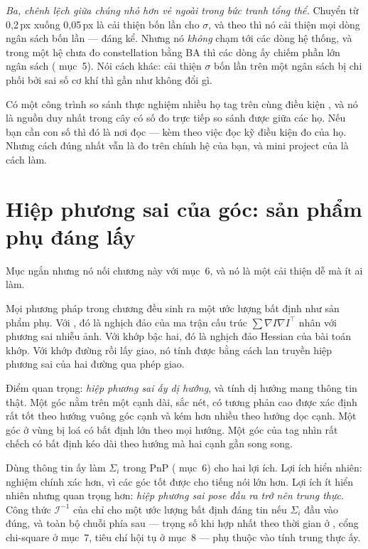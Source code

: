 \documentclass[../../marker.tex]{subfiles}
\begin{document}
\emph{Ba, chênh lệch giữa chúng nhỏ hơn vẻ ngoài trong bức tranh tổng thể.} Chuyển từ 0,2\,px xuống 0,05\,px là cải thiện bốn lần cho \(\sigma\), và theo  thì nó cải thiện mọi dòng ngân sách bốn lần --- đáng kể. Nhưng nó \emph{không} chạm tới các dòng hệ thống, và trong một hệ chưa đo constellation bằng BA thì các dòng ấy chiếm phần lớn ngân sách ( mục~5). Nói cách khác: cải thiện \(\sigma\) bốn lần trên một ngân sách bị chi phối bởi sai số cơ khí thì gần như không đổi gì.

Có một công trình so sánh thực nghiệm nhiều họ tag trên cùng điều kiện \cite{kalaitzakis2021fiducial}, và nó là nguồn duy nhất trong cây có số đo trực tiếp so sánh được giữa các họ. Nếu bạn cần con số thì đó là nơi đọc --- kèm theo việc đọc kỹ điều kiện đo của họ. Nhưng cách đúng nhất vẫn là đo trên chính hệ của bạn, và mini project của  là cách làm.

\section{Hiệp phương sai của góc: sản phẩm phụ đáng lấy}

Mục ngắn nhưng nó nối chương này với  mục~6, và nó là một cải thiện dễ mà ít ai làm.

Mọi phương pháp trong chương đều sinh ra một ước lượng bất định như sản phẩm phụ. Với , đó là nghịch đảo của ma trận cấu trúc \(\sum \nabla I \nabla I^\top\) nhân với phương sai nhiễu ảnh. Với khớp bậc hai, đó là nghịch đảo Hessian của bài toán khớp. Với khớp đường rồi lấy giao, nó tính được bằng cách lan truyền hiệp phương sai của hai đường qua phép giao.

Điểm quan trọng: \emph{hiệp phương sai ấy dị hướng}, và tính dị hướng mang thông tin thật. Một góc nằm trên một cạnh dài, sắc nét, có tương phản cao được xác định rất tốt theo hướng vuông góc cạnh và kém hơn nhiều theo hướng dọc cạnh. Một góc ở vùng bị loá có bất định lớn theo mọi hướng. Một góc của tag nhìn rất chếch có bất định kéo dài theo hướng mà hai cạnh gần song song.

Dùng thông tin ấy làm \(\Sigma_i\) trong PnP ( mục~6) cho hai lợi ích. Lợi ích hiển nhiên: nghiệm chính xác hơn, vì các góc tốt được cho tiếng nói lớn hơn. Lợi ích ít hiển nhiên nhưng quan trọng hơn: \emph{hiệp phương sai pose đầu ra trở nên trung thực}. Công thức \(\mathcal{I}^{-1}\) của  chỉ cho một ước lượng bất định đáng tin nếu \(\Sigma_i\) đầu vào đúng, và toàn bộ chuỗi phía sau --- trọng số khi hợp nhất theo thời gian ở , cổng chi-square ở  mục~7, tiêu chí hội tụ ở  mục~8 --- phụ thuộc vào tính trung thực ấy.
\end{document}
